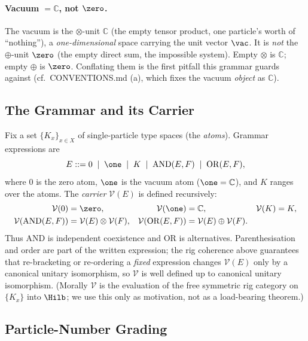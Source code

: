 \paragraph{Vacuum $=\mathbb C$, not $\zero$.}
The vacuum is the $\otimes$-unit $\mathbb C$ (the empty tensor product, one
particle's worth of ``nothing''), a \emph{one-dimensional} space carrying the unit
vector $\vac$. It is \emph{not} the $\oplus$-unit $\zero$ (the empty direct sum,
the impossible system). Empty $\otimes$ is $\mathbb C$; empty $\oplus$ is $\zero$.
Conflating them is the first pitfall this grammar guards against (cf.\
CONVENTIONS.md (a), which fixes the vacuum \emph{object} as $\mathbb C$).

\subsection{The Grammar and its Carrier}

Fix a set $\{K_x\}_{x\in X}$ of single-particle type spaces (the \emph{atoms}).
Grammar expressions are
\[
  E ::= 0 \;\mid\; \one \;\mid\; K \;\mid\;
        \mathrm{AND}(E,F) \;\mid\; \mathrm{OR}(E,F),
\]
where $0$ is the zero atom, $\one$ is the vacuum atom ($\one=\mathbb C$), and $K$
ranges over the atoms. The \emph{carrier} $\mathcal V(E)$ is defined recursively:
\[
\begin{aligned}
  \mathcal V(0) &= \zero, &
  \mathcal V(\one) &= \mathbb C, &
  \mathcal V(K) &= K, \\
  \mathcal V(\mathrm{AND}(E,F)) &= \mathcal V(E)\otimes \mathcal V(F), &
  \mathcal V(\mathrm{OR}(E,F)) &= \mathcal V(E)\oplus \mathcal V(F). &&
\end{aligned}
\]
Thus $\mathrm{AND}$ is independent coexistence and $\mathrm{OR}$ is alternatives.
Parenthesisation and order are part of the written expression; the rig coherence
above guarantees that re-bracketing or re-ordering a \emph{fixed} expression
changes $\mathcal V(E)$ only by a canonical unitary isomorphism, so $\mathcal V$ is
well defined up to canonical unitary isomorphism. (Morally $\mathcal V$ is the
evaluation of the free symmetric rig category on $\{K_x\}$ into $\Hilb$; we use
this only as motivation, not as a load-bearing theorem.)

\subsection{Particle-Number Grading}


